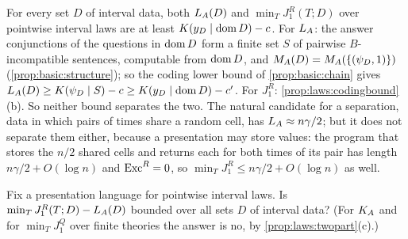\begin{remark}\label{rem:laws:JR}
For every set $D$ of interval data, both $L_{A}(D)$ and $\min_TJ^R_1(T;D)$ over pointwise interval laws are at least $K(y_D\mid\operatorname{dom} D)-c$. For $L_{A}$: the answer conjunctions of the questions in $\operatorname{dom} D$ form a finite set $S$ of pairwise $B$-incompatible sentences, computable from $\operatorname{dom} D$, and $M_{A}(D)=M_{A}(\{(\psi_D,1)\})$ (\cref{prop:basic:structure}); so the coding lower bound of \cref{prop:basic:chain} gives $L_{A}(D)\ge K(\psi_D\mid S)-c\ge K(y_D\mid\operatorname{dom} D)-c'$. For $J^R_1$: \cref{prop:laws:codingbound}(b). So neither bound separates the two. The natural candidate for a separation, data in which pairs of times share a random cell, has $L_{A}\approx n\gamma/2$; but it does not separate them either, because a presentation may store values: the program that stores the $n/2$ shared cells and returns each for both times of its pair has length $n\gamma/2+O(\log n)$ and $\mathrm{Exc}^R=0$, so $\min_TJ^R_1\le n\gamma/2+O(\log n)$ as well.
\end{remark}

\begin{question}\label{q:laws:JR}
Fix a presentation language for pointwise interval laws. Is $\min_TJ^R_1(T;D)-L_{A}(D)$ bounded over all sets $D$ of interval data? (For $K_{A}$ and for $\min_TJ^Q_1$ over finite theories the answer is no, by \cref{prop:laws:twopart}(c).)
\end{question}

